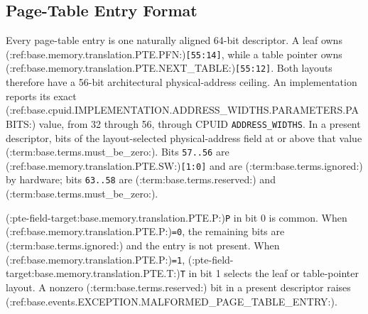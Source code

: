 \clearpage
\subsection{Page-Table Entry Format}\label{section:page-table-entry-format}

Every page-table entry is one naturally aligned 64-bit descriptor. A leaf owns
(:ref:base.memory.translation.PTE.PFN:)\texttt{[55:14]}, while a table pointer owns
(:ref:base.memory.translation.PTE.NEXT_TABLE:)\texttt{[55:12]}. Both layouts therefore have a 56-bit
architectural physical-address ceiling. An implementation reports its exact
(:ref:base.cpuid.IMPLEMENTATION.ADDRESS_WIDTHS.PARAMETERS.PABITS:) value, from 32 through 56, through CPUID
\texttt{ADDRESS\_WIDTHS}. In a present descriptor, bits of the layout-selected
physical-address field at or above that value (:term:base.terms.must_be_zero:).
Bits \texttt{57..56} are (:ref:base.memory.translation.PTE.SW:)\texttt{[1:0]} and are (:term:base.terms.ignored:)
by hardware; bits \texttt{63..58} are (:term:base.terms.reserved:) and (:term:base.terms.must_be_zero:).

(:pte-field-target:base.memory.translation.PTE.P:)\texttt{P} in bit 0 is common. When (:ref:base.memory.translation.PTE.P:)\texttt{=0}, the remaining bits are
(:term:base.terms.ignored:) and the entry is not present. When (:ref:base.memory.translation.PTE.P:)\texttt{=1}, (:pte-field-target:base.memory.translation.PTE.T:)\texttt{T} in bit 1
selects the leaf or table-pointer layout. A nonzero (:term:base.terms.reserved:) bit in a present
descriptor raises (:ref:base.events.EXCEPTION.MALFORMED_PAGE_TABLE_ENTRY:).

